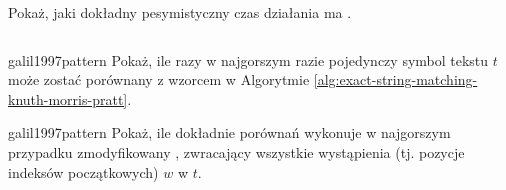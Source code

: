 \begin{code}
\inputminted{python}{code/other/strong-prefix-suffix.py}
\label{alg:strong-prefix-suffix}
\end{code}

\begin{problem}{}{}
  Pokaż, jaki dokładny pesymistyczny czas działania ma .
\end{problem}


\begin{code}
\inputminted{python}{code/exact-string-matching/knuth-morris-pratt.py}
\label{alg:exact-string-matching-knuth-morris-pratt}
\end{code}

\begin{problem}{galil1997pattern}{}
  Pokaż, ile razy w najgorszym razie pojedynczy symbol tekstu $t$ może zostać porównany z wzorcem w Algorytmie \ref{alg:exact-string-matching-knuth-morris-pratt}.
\end{problem}

\begin{problem}{galil1997pattern}{}
  Pokaż, ile dokładnie porównań wykonuje w najgorszym przypadku zmodyfikowany , zwracający wszystkie wystąpienia (tj. pozycje indeksów początkowych) $w$ w $t$.
\end{problem}
